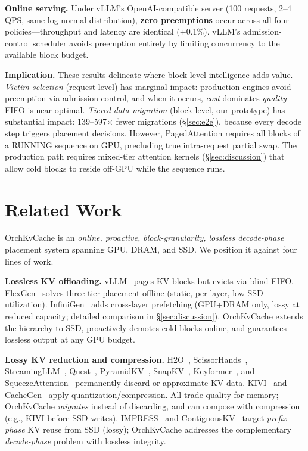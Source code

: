 \documentclass[conference]{IEEEtran}
\begin{document}
\textbf{Online serving.} Under vLLM's OpenAI-compatible server (100 requests, 2--4 QPS, same log-normal distribution), \textbf{zero preemptions} occur across all four policies---throughput and latency are identical ($\pm$0.1\%). vLLM's admission-control scheduler avoids preemption entirely by limiting concurrency to the available block budget.

\textbf{Implication.} These results delineate where block-level intelligence adds value. \emph{Victim selection} (request-level) has marginal impact: production engines avoid preemption via admission control, and when it occurs, \emph{cost} dominates \emph{quality}---FIFO is near-optimal. \emph{Tiered data migration} (block-level, our prototype) has substantial impact: 139--597$\times$ fewer migrations (\S\ref{sec:e2e}), because every decode step triggers placement decisions. However, PagedAttention requires all blocks of a RUNNING sequence on GPU, precluding true intra-request partial swap. The production path requires mixed-tier attention kernels (\S\ref{sec:discussion}) that allow cold blocks to reside off-GPU while the sequence runs.

\section{Related Work}

OrchKvCache is an \emph{online, proactive, block-granularity, lossless decode-phase} placement system spanning GPU, DRAM, and SSD. We position it against four lines of work.

\textbf{Lossless KV offloading.}
vLLM~\cite{vllm} pages KV blocks but evicts via blind FIFO. FlexGen~\cite{flexgen} solves three-tier placement offline (static, per-layer, low SSD utilization). InfiniGen~\cite{infinigen} adds cross-layer prefetching (GPU+DRAM only, lossy at reduced capacity; detailed comparison in \S\ref{sec:discussion}). OrchKvCache extends the hierarchy to SSD, proactively demotes cold blocks online, and guarantees lossless output at any GPU budget.

\textbf{Lossy KV reduction and compression.}
H2O~\cite{h2o}, ScissorHands~\cite{scissorhands}, StreamingLLM~\cite{streamingllm}, Quest~\cite{quest}, PyramidKV~\cite{pyramidkv}, SnapKV~\cite{snapkv}, Keyformer~\cite{keyformer}, and SqueezeAttention~\cite{squeezeattention} permanently discard or approximate KV data. KIVI~\cite{kivi} and CacheGen~\cite{cachegen} apply quantization/compression. All trade quality for memory; OrchKvCache \emph{migrates} instead of discarding, and can compose with compression (e.g., KIVI before SSD writes). IMPRESS~\cite{impress} and ContiguousKV~\cite{contiguouskv} target \emph{prefix-phase} KV reuse from SSD (lossy); OrchKvCache addresses the complementary \emph{decode-phase} problem with lossless integrity.
\end{document}
